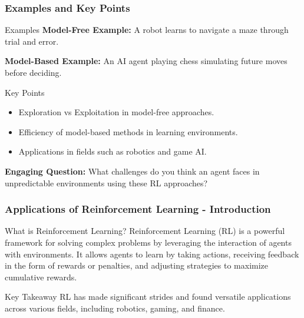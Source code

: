 \documentclass[aspectratio=169]{beamer}
\begin{document}
\begin{frame}[fragile]
  \frametitle{Examples and Key Points}
  
  \begin{block}{Examples}
    \textbf{Model-Free Example:} A robot learns to navigate a maze through trial and error.
    
    \textbf{Model-Based Example:} An AI agent playing chess simulating future moves before deciding.
  \end{block}

  \begin{block}{Key Points}
    \begin{itemize}
      \item Exploration vs Exploitation in model-free approaches.
      \item Efficiency of model-based methods in learning environments.
      \item Applications in fields such as robotics and game AI.
    \end{itemize}
  \end{block}
  
  \textbf{Engaging Question:} What challenges do you think an agent faces in unpredictable environments using these RL approaches?
  
\end{frame}

\begin{frame}[fragile]
    \frametitle{Applications of Reinforcement Learning - Introduction}
    \begin{block}{What is Reinforcement Learning?}
        Reinforcement Learning (RL) is a powerful framework for solving complex problems by leveraging the interaction of agents with environments. 
        It allows agents to learn by taking actions, receiving feedback in the form of rewards or penalties, and adjusting strategies to maximize cumulative rewards.
    \end{block}
    
    \begin{block}{Key Takeaway}
        RL has made significant strides and found versatile applications across various fields, including robotics, gaming, and finance.
    \end{block}
\end{frame}
\end{document}
